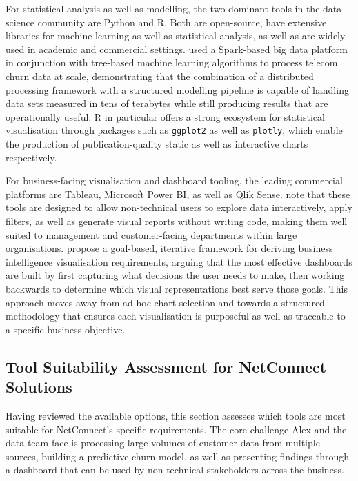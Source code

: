 \documentclass[12pt,a4paper]{article}
\begin{document}
For statistical analysis as well as modelling, the two dominant tools in the data science community are Python and R. Both are open-source, have extensive libraries for machine learning as well as statistical analysis, as well as are widely used in academic and commercial settings. \textcite{Ahmad2019} used a Spark-based big data platform in conjunction with tree-based machine learning algorithms to process telecom churn data at scale, demonstrating that the combination of a distributed processing framework with a structured modelling pipeline is capable of handling data sets measured in tens of terabytes while still producing results that are operationally useful. R in particular offers a strong ecosystem for statistical visualisation through packages such as \texttt{ggplot2} as well as \texttt{plotly}, which enable the production of publication-quality static as well as interactive charts respectively.

For business-facing visualisation and dashboard tooling, the leading commercial platforms are Tableau, Microsoft Power BI, as well as Qlik Sense. \textcite{Gahar2024} note that these tools are designed to allow non-technical users to explore data interactively, apply filters, as well as generate visual reports without writing code, making them well suited to management and customer-facing departments within large organisations. \textcite{Lavalle2024} propose a goal-based, iterative framework for deriving business intelligence visualisation requirements, arguing that the most effective dashboards are built by first capturing what decisions the user needs to make, then working backwards to determine which visual representations best serve those goals. This approach moves away from ad hoc chart selection and towards a structured methodology that ensures each visualisation is purposeful as well as traceable to a specific business objective.

\subsection{Tool Suitability Assessment for NetConnect Solutions}

Having reviewed the available options, this section assesses which tools are most suitable for NetConnect's specific requirements. The core challenge Alex and the data team face is processing large volumes of customer data from multiple sources, building a predictive churn model, as well as presenting findings through a dashboard that can be used by non-technical stakeholders across the business.
\end{document}
